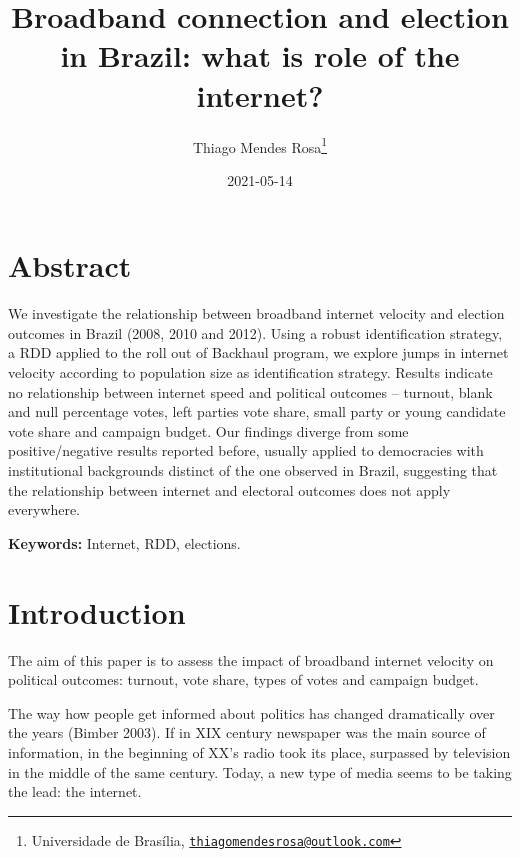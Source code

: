 \documentclass[
  12pt,
]{article}
\title{Broadband connection and election in Brazil: what is role of the
internet?}
\author{Thiago Mendes Rosa\footnote{Universidade de Brasília,
  \href{mailto:thiagomendesrosa@outlook.com}{\nolinkurl{thiagomendesrosa@outlook.com}}}}
\date{2021-05-14}
\begin{document}
\maketitle

\let\oldthebibliography\thebibliography
\let\endoldthebibliography\endthebibliography
\renewenvironment{thebibliography}[1]{
  \begin{oldthebibliography}{#1}
    \setlength{\itemsep}{0em}
    \setlength{\parskip}{0em}
}
{
  \end{oldthebibliography}
}

\allsectionsfont{\centering}

\hypertarget{abstract}{%
\section*{Abstract}\label{abstract}}

We investigate the relationship between broadband internet velocity and
election outcomes in Brazil (2008, 2010 and 2012). Using a robust
identification strategy, a RDD applied to the roll out of Backhaul
program, we explore jumps in internet velocity according to population
size as identification strategy. Results indicate no relationship
between internet speed and political outcomes -- turnout, blank and null
percentage votes, left parties vote share, small party or young
candidate vote share and campaign budget. Our findings diverge from some
positive/negative results reported before, usually applied to
democracies with institutional backgrounds distinct of the one observed
in Brazil, suggesting that the relationship between internet and
electoral outcomes does not apply everywhere.

\textbf{Keywords:} Internet, RDD, elections.

\allsectionsfont{\raggedright}

\clearpage

\hypertarget{introduction}{%
\section*{Introduction}\label{introduction}}

The aim of this paper is to assess the impact of broadband internet
velocity on political outcomes: turnout, vote share, types of votes and
campaign budget.

The way how people get informed about politics has changed dramatically
over the years (Bimber 2003). If in XIX century newspaper was the main
source of information, in the beginning of XX's radio took its place,
surpassed by television in the middle of the same century. Today, a new
type of media seems to be taking the lead: the internet.
\end{document}
